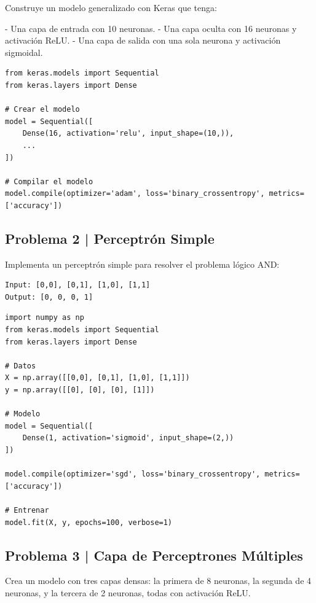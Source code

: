 \documentclass{article}
\begin{document}
Construye un modelo generalizado con Keras que tenga:

- Una capa de entrada con 10 neuronas.
- Una capa oculta con 16 neuronas y activación ReLU.
- Una capa de salida con una sola neurona y activación sigmoidal.

\begin{lstlisting}[style=python]
from keras.models import Sequential
from keras.layers import Dense

# Crear el modelo
model = Sequential([
    Dense(16, activation='relu', input_shape=(10,)),
    ...
])

# Compilar el modelo
model.compile(optimizer='adam', loss='binary_crossentropy', metrics=['accuracy'])
\end{lstlisting}

\clearpage

\subsection*{Problema 2 | Perceptrón Simple}

Implementa un perceptrón simple para resolver el problema lógico AND:

\begin{verbatim}
Input: [0,0], [0,1], [1,0], [1,1]
Output: [0, 0, 0, 1]
\end{verbatim}

\begin{lstlisting}[style=python]
import numpy as np
from keras.models import Sequential
from keras.layers import Dense

# Datos
X = np.array([[0,0], [0,1], [1,0], [1,1]])
y = np.array([[0], [0], [0], [1]])

# Modelo
model = Sequential([
    Dense(1, activation='sigmoid', input_shape=(2,))
])

model.compile(optimizer='sgd', loss='binary_crossentropy', metrics=['accuracy'])

# Entrenar
model.fit(X, y, epochs=100, verbose=1)
\end{lstlisting}

\clearpage

\subsection*{Problema 3 | Capa de Perceptrones Múltiples}

Crea un modelo con tres capas densas: la primera de 8 neuronas, la segunda de 4 neuronas, y la tercera de 2 neuronas, todas con activación ReLU.
\end{document}
